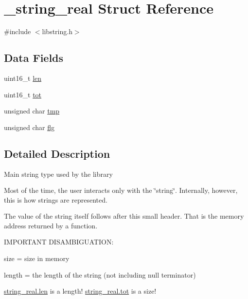 \hypertarget{struct__string__real}{\section{\-\_\-string\-\_\-real Struct Reference}
\label{struct__string__real}
}


{\ttfamily \#include $<$libstring.\-h$>$}

\subsection*{Data Fields}
\begin{DoxyCompactItemize}
\item 
uint16\-\_\-t \hyperlink{struct__string__real_a4c51041b496d561d8ea8c8af4aa34ea5}{len}
\item 
uint16\-\_\-t \hyperlink{struct__string__real_a0a2aeea98f557b0e98e15aa42414e855}{tot}
\item 
unsigned char \hyperlink{struct__string__real_a205f432017baaaf2b429a5c835510152}{tmp}
\item 
unsigned char \hyperlink{struct__string__real_ac23d3f9fe5d59437dece0bc99488ef85}{flg}
\end{DoxyCompactItemize}


\subsection{Detailed Description}
Main string type used by the library

Most of the time, the user interacts only with the \char`\"{}string\char`\"{}. Internally, however, this is how strings are represented.

The value of the string itself follows after this small header. That is the memory address returned by a function.

I\-M\-P\-O\-R\-T\-A\-N\-T D\-I\-S\-A\-M\-B\-I\-G\-U\-A\-T\-I\-O\-N\-:


\begin{DoxyItemize}
\item size = size in memory
\item length = the length of the string (not including null terminator)
\end{DoxyItemize}

\hyperlink{struct__string__real_a4c51041b496d561d8ea8c8af4aa34ea5}{string\-\_\-real.\-len} is a length! \hyperlink{struct__string__real_a0a2aeea98f557b0e98e15aa42414e855}{string\-\_\-real.\-tot} is a size! 

